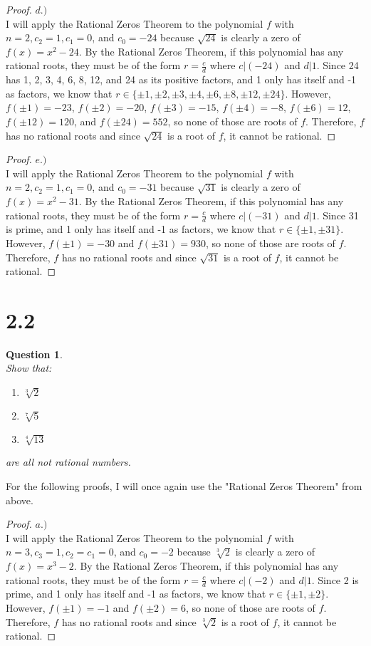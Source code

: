 \documentclass[10pt,a4paper]{article}
\newtheorem*{question*}{Question}
\begin{document}
\begin{proof}{$d.)$}
\\I will apply the Rational Zeros Theorem to the polynomial $f$ with $n = 2, c_2 = 1, c_1 = 0$, and $c_0 = -24$ because $\sqrt{24}$ is clearly a zero of $f(x) = x^2 - 24$. By the Rational Zeros Theorem, if this polynomial has any rational roots, they must be of the form $r = \frac{c}{d}$ where $c|(-24)$ and $d|1$. Since 24 has 1, 2, 3, 4, 6, 8, 12, and 24 as its positive factors, and 1 only has itself and -1 as factors, we know that $r \in \{\pm 1,\pm 2, \pm 3, \pm 4, \pm 6, \pm 8, \pm 12, \pm 24\}$. However, $f(\pm 1) = -23$, $f(\pm 2) = -20$, $f(\pm 3) = -15$, $f(\pm 4) = -8$, $f(\pm 6) = 12$, $f(\pm 12) = 120$, and $f(\pm 24) = 552$, so none of those are roots of $f$. Therefore, $f$ has no rational roots and since $\sqrt{24}$ is a root of $f$, it cannot be rational. 
\end{proof}

\begin{proof}{$e.)$}
\\I will apply the Rational Zeros Theorem to the polynomial $f$ with $n = 2, c_2 = 1, c_1 = 0$, and $c_0 = -31$ because $\sqrt{31}$ is clearly a zero of $f(x) = x^2 - 31$. By the Rational Zeros Theorem, if this polynomial has any rational roots, they must be of the form $r = \frac{c}{d}$ where $c|(-31)$ and $d|1$. Since 31 is prime, and 1 only has itself and -1 as factors, we know that $r \in \{\pm 1,\pm 31\}$. However, $f(\pm 1) = -30$ and $f(\pm 31) = 930$, so none of those are roots of $f$. Therefore, $f$ has no rational roots and since $\sqrt{31}$ is a root of $f$, it cannot be rational. 
\end{proof}

\section*{2.2}
\begin{question*}{$ $}
\\Show that:
\begin{enumerate}[label=\alph*)]
\item $\sqrt[3]{2}$
\item $\sqrt[7]{5}$
\item $\sqrt[4]{13}$
\end{enumerate}
are all not rational numbers. 
\end{question*}
For the following proofs, I will once again use the "Rational Zeros Theorem" from above. 

\begin{proof}{$a.)$}
\\I will apply the Rational Zeros Theorem to the polynomial $f$ with $n = 3, c_3 = 1, c_2 = c_1 = 0$, and $c_0 = -2$ because $\sqrt[3]{2}$ is clearly a zero of $f(x) = x^3 - 2$. By the Rational Zeros Theorem, if this polynomial has any rational roots, they must be of the form $r = \frac{c}{d}$ where $c|(-2)$ and $d|1$. Since 2 is prime, and 1 only has itself and -1 as factors, we know that $r \in \{\pm 1,\pm 2\}$. However, $f(\pm 1) = -1$ and $f(\pm 2) = 6$, so none of those are roots of $f$. Therefore, $f$ has no rational roots and since $\sqrt[3]{2}$ is a root of $f$, it cannot be rational. 
\end{proof}
\end{document}
